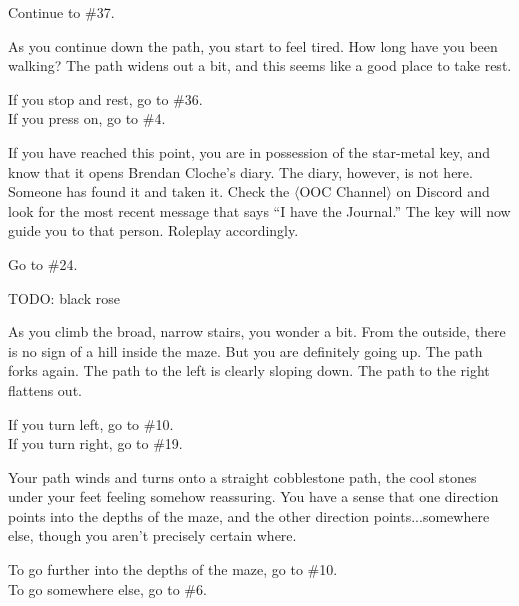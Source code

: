 \documentclass[green]{gl2018}
\begin{document}
\begin{LARGE}
\begin{location}{19}
\begin{fromhere}  Continue to \#37.\end{fromhere}
\end{location}
\begin{location}{20}
As you continue down the path, you start to feel tired. How long have you been walking? The path widens out a bit, and this seems like a good place to take rest.
\begin{fromhere} If you stop and rest, go to \#36.\\
 If you press on, go to \#4.
\end{fromhere}
\end{location}
\begin{location}{21}
If you have reached this point, you are in possession of the star-metal key, and know that it opens Brendan Cloche's diary. The diary, however, is not here. Someone has found it and taken it. Check the $\langle$OOC Channel$\rangle$ on Discord and look for the most recent message that says “I have the Journal.” The key will now guide you to that person.  Roleplay accordingly. 
\begin{fromhere}Go to \#24.\end{fromhere}
\end{location}
\begin{location}{22}
TODO: black rose
\end{location}
\begin{location}{23}
As you climb the broad, narrow stairs, you wonder a bit. From the outside, there is no sign of a hill inside the maze. But you are definitely going up. The path forks again. The path to the left is clearly sloping down. The path to the right flattens out.
\begin{fromhere} If you turn left, go to \#10.\\ If you turn right,  go to \#19.\end{fromhere}
\end{location}
\begin{location}{24}
Your path winds and turns onto a straight cobblestone path, the cool stones under your feet feeling somehow reassuring.  You have a sense that one direction points into the depths of the maze, and the other direction points...somewhere else, though you aren't precisely certain where.  
\begin{fromhere}To go further into the depths of the maze, go to \#10.\\  To go somewhere else, go to \#6.\end{fromhere}

\end{location}
\end{LARGE}
\end{document}

